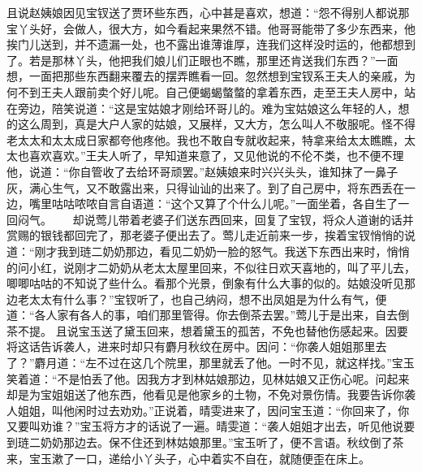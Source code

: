 \documentclass[12pt,oneside]{book}
\begin{document}
且说赵姨娘因见宝钗送了贾环些东西，心中甚是喜欢，想道：“怨不得别人都说那宝丫头好，会做人，很大方，如今看起来果然不错。他哥哥能带了多少东西来，他挨门儿送到，并不遗漏一处，也不露出谁薄谁厚，连我们这样没时运的，他都想到了。若是那林丫头，他把我们娘儿们正眼也不瞧，那里还肯送我们东西？”一面想，一面把那些东西翻来覆去的摆弄瞧看一回。忽然想到宝钗系王夫人的亲戚，为何不到王夫人跟前卖个好儿呢。自己便蝎蝎螫螫的拿着东西，走至王夫人房中，站在旁边，陪笑说道：“这是宝姑娘才刚给环哥儿的。难为宝姑娘这么年轻的人，想的这么周到，真是大户人家的姑娘，又展样，又大方，怎么叫人不敬服呢。怪不得老太太和太太成日家都夸他疼他。我也不敢自专就收起来，特拿来给太太瞧瞧，太太也喜欢喜欢。”王夫人听了，早知道来意了，又见他说的不伦不类，也不便不理他，说道：“你自管收了去给环哥顽罢。”赵姨娘来时兴兴头头，谁知抹了一鼻子灰，满心生气，又不敢露出来，只得讪讪的出来了。到了自己房中，将东西丢在一边，嘴里咕咕哝哝自言自语道：“这个又算了个什么儿呢。”一面坐着，各自生了一回闷气。　　
却说莺儿带着老婆子们送东西回来，回复了宝钗，将众人道谢的话并赏赐的银钱都回完了，那老婆子便出去了。莺儿走近前来一步，挨着宝钗悄悄的说道：“刚才我到琏二奶奶那边，看见二奶奶一脸的怒气。我送下东西出来时，悄悄的问小红，说刚才二奶奶从老太太屋里回来，不似往日欢天喜地的，叫了平儿去，唧唧咕咕的不知说了些什么。看那个光景，倒象有什么大事的似的。姑娘没听见那边老太太有什么事？”宝钗听了，也自己纳闷，想不出凤姐是为什么有气，便道：“各人家有各人的事，咱们那里管得。你去倒茶去罢。”莺儿于是出来，自去倒茶不提。
且说宝玉送了黛玉回来，想着黛玉的孤苦，不免也替他伤感起来。因要将这话告诉袭人，进来时却只有麝月秋纹在房中。因问：“你袭人姐姐那里去了？”麝月道：“左不过在这几个院里，那里就丢了他。一时不见，就这样找。”宝玉笑着道：“不是怕丢了他。因我方才到林姑娘那边，见林姑娘又正伤心呢。问起来却是为宝姐姐送了他东西，他看见是他家乡的土物，不免对景伤情。我要告诉你袭人姐姐，叫他闲时过去劝劝。”正说着，晴雯进来了，因问宝玉道：“你回来了，你又要叫劝谁？”宝玉将方才的话说了一遍。晴雯道：“袭人姐姐才出去，听见他说要到琏二奶奶那边去。保不住还到林姑娘那里。”宝玉听了，便不言语。秋纹倒了茶来，宝玉漱了一口，递给小丫头子，心中着实不自在，就随便歪在床上。
\end{document}
